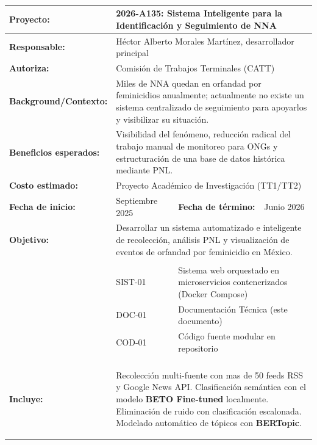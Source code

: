 
\newcommand{\ESCOMPchSec}[1]{\rowcolor{colorAgua}\multicolumn{4}{|c|}{\bf #1}\\\hline}
\newcommand{\ESCOMPchItem}[2]{{\bf {#1}} & \multicolumn{3}{p{.66\textwidth}|}{#2}\\\hline}
\newcommand{\ESCOMPchSubItem}[3]{{\bf {#1}} & {#2} & \multicolumn{2}{p{.44\textwidth}|}{#3}\\\hline}
\newcommand{\ESCOMPchSubSubItem}[4]{{\bf {#1}} & {#2} & {#3}& {#4}\\\hline}

\cleardoublepage
{\bigskip\\}
\begin{table}[hptb!] 
\begin{tabular}{|p{} |p{} |p{} |p{} |}
	\hline
	\ESCOMPchItem{Proyecto:}{2026-A135: Sistema Inteligente para la Identificación y Seguimiento de NNA}
	\ESCOMPchItem{Responsable:}{Héctor Alberto Morales Martínez, desarrollador principal}
	\ESCOMPchItem{Autoriza:}{Comisión de Trabajos Terminales (CATT)}
	\ESCOMPchItem{Background/Contexto:}{Miles de NNA quedan en orfandad por feminicidios anualmente; actualmente no existe un sistema centralizado de seguimiento para apoyarlos y visibilizar su situación.}
	\ESCOMPchItem{Beneficios esperados:}{Visibilidad del fenómeno, reducción radical del trabajo manual de monitoreo para ONGs y estructuración de una base de datos histórica mediante PNL.}
	\ESCOMPchItem{Costo estimado:}{Proyecto Académico de Investigación (TT1/TT2)}
	\ESCOMPchSubSubItem{Fecha de inicio:}{Septiembre 2025}{\bf Fecha de término:}{Junio 2026}
	\ESCOMPchItem{Objetivo:}{Desarrollar un sistema automatizado e inteligente de recolección, análisis PNL y visualización de eventos de orfandad por feminicidio en México.}
	\ESCOMPchSec{Entregables Principales}
	\ESCOMPchSubItem{}{SIST-01}{Sistema web orquestado en microservicios contenerizados (Docker Compose)}
	\ESCOMPchSubItem{}{DOC-01}{Documentación Técnica (este documento)}
	\ESCOMPchSubItem{}{COD-01}{Código fuente modular en repositorio}
	\ESCOMPchSec{Alcance del proyecto}
	\ESCOMPchItem{Incluye:}{
		\begin{Titemize}
			\Titem Recolección multi-fuente con mas de 50 feeds RSS y Google News API.
			\Titem Clasificación semántica con el modelo \textbf{BETO Fine-tuned} localmente.
			\Titem Eliminación de ruido con clasificación escalonada.
			\Titem Modelado automático de tópicos con \textbf{BERTopic}.

\end{Titemize}}
\end{tabular}
\end{table}
